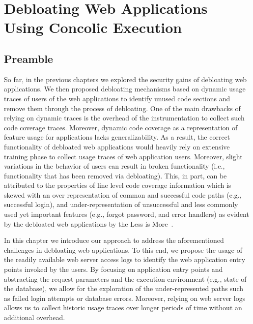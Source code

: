 \chapter{Debloating Web Applications Using Concolic Execution}
\label{chap:ad}
\section*{Preamble}

So far, in the previous chapters we explored the security gains of debloating web applications. 
We then proposed debloating mechanisms based on dynamic usage traces of users of the web applications to identify unused code sections and remove them through the process of debloating. 
One of the main drawbacks of relying on dynamic traces is the overhead of the instrumentation to collect such code coverage traces. 
Moreover, dynamic code coverage as a representation of feature usage for applications lacks generalizability. 
As a result, the correct functionality of debloated web applications would heavily rely on extensive training phase to collect usage traces of web application users. 
Moreover, slight variations in the behavior of users can result in broken functionality (i.e., functionality that has been removed via debloating). 
This, in part, can be attributed to the properties of line level code coverage information which is skewed with an over representation of common and successful code paths (e.g., successful login), and under-representation of unsuccessful and less commonly used yet important features (e.g., forgot password, and error handlers) as evident by the debloated web applications by the Less is More~\cite{azad2019less}.

In this chapter we introduce our approach to address the aforementioned challenges in debloating web applications. 
To this end, we propose the usage of the readily available web server access logs to identify the web application entry points invoked by the users. 
By focusing on application entry points and abstracting the request parameters and the execution environment (e.g., state of the database), we allow for the exploration of the under-represented paths such as failed login attempts or database errors. 
Moreover, relying on web server logs allows us to collect historic usage traces over longer periods of time without an additional overhead.

